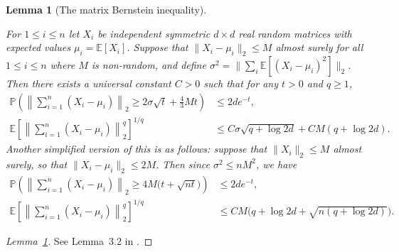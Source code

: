 \documentclass[11pt,lof]{puthesis}
\renewcommand{\P}{\ensuremath{\mathbb{P}}}
\newcommand{\E}{\ensuremath{\mathbb{E}}}
\theoremstyle{break}
\newtheorem{lemma}{Lemma}[section]
\theoremstyle{proof}
\newtheorem{proof}{Proof}
\begin{document}
\begin{lemma}[The matrix Bernstein inequality]
  \label{lem:kernel_app_matrix_bernstein}

  For $1 \leq i \leq n$
  let $X_i$ be independent symmetric $d \times d$
  real random matrices
  with expected values $\mu_i = \E[X_i]$.
  Suppose that
  $\|X_i - \mu_i\|_2 \leq M$
  almost surely for all $1 \leq i \leq n$
  where $M$ is non-random, and define
  $\sigma^2 = \big\| \sum_i \E[(X_i - \mu_i)^2] \big\|_2$.
  Then there exists a universal constant $C > 0$
  such that
  for any $t > 0$ and $q \geq 1$,
  \begin{align*}
    \P\left(
      \left\|
      \sum_{i=1}^n
      \left(
        X_i - \mu_i
      \right)
      \right\|_2
      \geq
      2 \sigma \sqrt{t}
      + \frac{4}{3} M t
    \right)
    &\leq
    2 d e^{-t}, \\
    \E\left[
      \left\|
      \sum_{i=1}^n
      \left(
        X_i - \mu_i
      \right)
      \right\|_2^q
    \right]^{1/q}
    &\leq
    C \sigma \sqrt{q + \log 2d}
    + C M (q + \log 2d).
  \end{align*}
  Another simplified version of this is as follows:
  suppose that
  $\|X_i\|_2 \leq M$ almost surely,
  so that
  $\|X_i - \mu_i\|_2 \leq 2M$.
  Then since
  $\sigma^2 \leq n M^2$,
  we have
  \begin{align*}
    \P\left(
      \left\|
      \sum_{i=1}^n
      \left(
        X_i - \mu_i
      \right)
      \right\|_2
      \geq
      4M \big(t + \sqrt{n t}\big)
    \right)
    &\leq
    2 d e^{-t}, \\
    \E\left[
      \left\|
      \sum_{i=1}^n
      \left(
        X_i - \mu_i
      \right)
      \right\|_2^q
    \right]^{1/q}
    &\leq
    C M
    \big(q + \log 2d + \sqrt{n(q + \log 2d)}\big).
  \end{align*}

\end{lemma}

\begin{proof}[Lemma~\ref{lem:kernel_app_matrix_bernstein}]

  See Lemma~3.2 in \citet{minsker2019moment}.
\end{proof}
\end{document}
